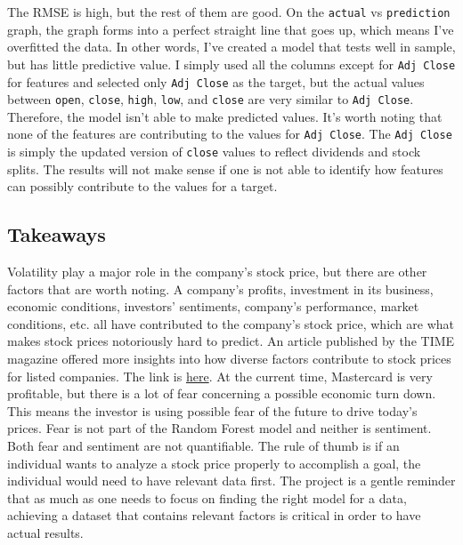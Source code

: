 \documentclass[11pt]{article}
\begin{document}
    The RMSE is high, but the rest of them are good. On the \texttt{actual}
vs \texttt{prediction} graph, the graph forms into a perfect straight
line that goes up, which means I've overfitted the data. In other words,
I've created a model that tests well in sample, but has little
predictive value. I simply used all the columns except for
\texttt{Adj\ Close} for features and selected only \texttt{Adj\ Close}
as the target, but the actual values between \texttt{open},
\texttt{close}, \texttt{high}, \texttt{low}, and \texttt{close} are very
similar to \texttt{Adj\ Close}. Therefore, the model isn't able to make
predicted values. It's worth noting that none of the features are
contributing to the values for \texttt{Adj\ Close}. The
\texttt{Adj\ Close} is simply the updated version of \texttt{close}
values to reflect dividends and stock splits. The results will not make
sense if one is not able to identify how features can possibly
contribute to the values for a target.

    \hypertarget{takeaways}{%
\subsection{Takeaways}\label{takeaways}}

Volatility play a major role in the company's stock price, but there are
other factors that are worth noting. A company's profits, investment in
its business, economic conditions, investors' sentiments, company's
performance, market conditions, etc. all have contributed to the
company's stock price, which are what makes stock prices notoriously
hard to predict. An article published by the TIME magazine offered more
insights into how diverse factors contribute to stock prices for listed
companies. The link is
\href{https://time.com/personal-finance/article/how-are-stock-prices-determined/}{here}.
At the current time, Mastercard is very profitable, but there is a lot
of fear concerning a possible economic turn down. This means the
investor is using possible fear of the future to drive today's prices.
Fear is not part of the Random Forest model and neither is sentiment.
Both fear and sentiment are not quantifiable. The rule of thumb is if an
individual wants to analyze a stock price properly to accomplish a goal,
the individual would need to have relevant data first. The project is a
gentle reminder that as much as one needs to focus on finding the right
model for a data, achieving a dataset that contains relevant factors is
critical in order to have actual results.


    
    
    
\end{document}
